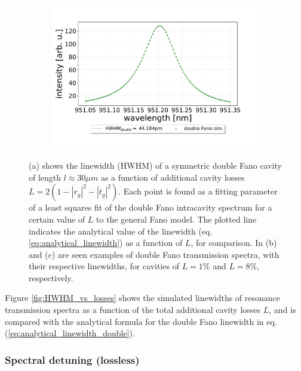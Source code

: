\begin{figure}[h!]
\begin{subfigure}[c]{0.49\textwidth}
        \caption{}
        \label{fig:lossy_spectrum_0.2percent}
    \end{subfigure}
    \begin{subfigure}[c]{0.49\textwidth}
        \includegraphics[width=\textwidth]{figures/double_8percent_loss_30um.pdf}
        \caption{}
        \label{fig:lossy_spectrum_3.2percent}
    \end{subfigure}
    \caption{(a) shows the linewidth (HWHM) of a symmetric double Fano cavity of length $l \approx 30 \mu m$  as a function of additional cavity losses $L = 2(1 - |r_g|^2 - |t_g|^2)$. Each point is found as a fitting parameter of a least squares fit of the double Fano intracavity spectrum for a certain value of $L$ to the general Fano model. The plotted line indicates the analytical value of the linewidth (eq. \ref{eq:analytical_linewidth}) as a function of $L$, for comparison. In (b) and (c) are seen examples of double Fano transmission spectra, with their respective linewidths, for cavities of $L=1\%$ and $L=8\%$, respectively.}
    \label{fig:HWHM_vs_losses_whole_figure}
\end{figure}

Figure \ref{fig:HWHM_vs_losses} shows the simulated linewidths of resonance transmission spectra as a function of the total additional cavity losses $L$, and is compared with the analytical formula for the double Fano linewidth in eq. (\ref{eq:analytical_linewidth_double}).

\subsubsection{Spectral detuning (lossless)} \label{sec:spectral_detuning}

